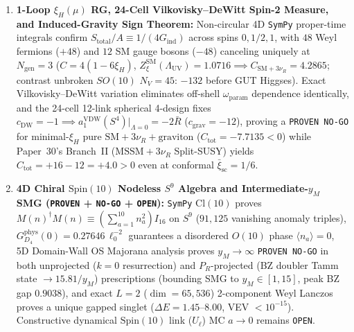 \documentclass[11pt,a4paper]{article}
\begin{document}
\begin{enumerate}
\item \textbf{1-Loop $\xi_H(\mu)$ RG, 24-Cell Vilkovisky--DeWitt Spin-2 Measure, and Induced-Gravity Sign Theorem:} Non-circular 4D \texttt{SymPy} proper-time integrals confirm $S_{\mathrm{total}}/A \equiv 1/(4G_{\mathrm{ind}})$ across spins $0,1/2,1$, with $48$ Weyl fermions ($+48$) and $12$ SM gauge bosons ($-48$) canceling uniquely at $N_{\mathrm{gen}}=3$ ($C=4(1-6\xi_H)$, $Z_\xi^{\mathrm{SM}}(\Lambda_{\mathrm{UV}})=1.0716\implies C_{\mathrm{SM}+3\nu_R}=4.2865$; contrast unbroken $SO(10)$ $N_V=45$: $-132$ before GUT Higgses). Exact Vilkovisky--\allowbreak DeWitt variation eliminates off-shell $\omega_{\mathrm{param}}$ dependence identically, and the 24-cell 12-link spherical 4-design fixes $c_{\mathrm{DW}}=-1\implies a_1^{\mathrm{VDW}}(S^4)|_{\Lambda=0}=-2\bar R$ ($c_{\mathrm{grav}}=-12$), proving a \texttt{PROVEN NO-GO} for minimal-$\xi_H$ pure $\mathrm{SM}+3\nu_R+\text{graviton}$ ($C_{\mathrm{tot}}=-7.7135<0$) while Paper~30's Branch~II ($\mathrm{MSSM}+3\nu_R$ Split-SUSY) yields $C_{\mathrm{tot}}=+16-12=+4.0>0$ even at conformal $\bar\xi_{\mathrm{sc}}=1/6$.
\item \textbf{4D Chiral $\mathrm{Spin}(10)$ Nodeless $S^9$ Algebra and Intermediate-$y_M$ SMG (\texttt{PROVEN} + \texttt{NO-GO} + \texttt{OPEN}):} \texttt{SymPy} $\mathrm{Cl}(10)$ proves $M(n)^\dagger M(n)\equiv (\sum_{a=1}^{10} n_a^2)I_{16}$ on $S^9$ ($91{,}125$ vanishing anomaly triples), $G_{D_4}^{\mathrm{phys}}(0)=0.27646\,\ell_0^{-2}$ guarantees a disordered $O(10)$ phase $\langle n_a\rangle=0$, 5D Domain-Wall OS Majorana analysis proves $y_M\to\infty$ \texttt{PROVEN NO-GO} in both unprojected ($k=0$ resurrection) and $P_R$-projected (BZ doubler Tamm state $\to 15.81/y_M$) prescriptions (bounding SMG to $y_M\in[1,15]$, peak BZ gap $0.9038$), and exact $L=2$ ($\dim=65{,}536$) 2-component Weyl Lanczos proves a unique gapped singlet ($\Delta E=1.45\text{--}8.00$, VEV $<10^{-15}$). Constructive dynamical $\mathrm{Spin}(10)$ link ($U_\ell$) MC $a\to 0$ remains \texttt{OPEN}.
\end{enumerate}
\end{document}
